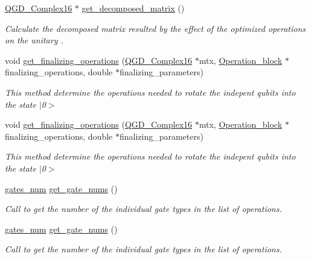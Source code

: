 \begin{DoxyCompactItemize}
\hyperlink{struct_q_g_d___complex16}{Q\+G\+D\+\_\+\+Complex16} $\ast$ \hyperlink{class_decomposition___base_ae71eaec68c77e79716cae632f97d42eb}{get\+\_\+decomposed\+\_\+matrix} ()
\begin{DoxyCompactList}\small\item\em Calculate the decomposed matrix resulted by the effect of the optimized operations on the unitary . \end{DoxyCompactList}\item 
void \hyperlink{class_decomposition___base_a9832cc5308c00b73d3e6bc331a77c7f7}{get\+\_\+finalizing\+\_\+operations} (\hyperlink{struct_q_g_d___complex16}{Q\+G\+D\+\_\+\+Complex16} $\ast$mtx, \hyperlink{class_operation__block}{Operation\+\_\+block} $\ast$finalizing\+\_\+operations, double $\ast$finalizing\+\_\+parameters)
\begin{DoxyCompactList}\small\item\em This method determine the operations needed to rotate the indepent qubits into the state $\vert$0$>$ \end{DoxyCompactList}\item 
void \hyperlink{class_decomposition___base_a9832cc5308c00b73d3e6bc331a77c7f7}{get\+\_\+finalizing\+\_\+operations} (\hyperlink{struct_q_g_d___complex16}{Q\+G\+D\+\_\+\+Complex16} $\ast$mtx, \hyperlink{class_operation__block}{Operation\+\_\+block} $\ast$finalizing\+\_\+operations, double $\ast$finalizing\+\_\+parameters)
\begin{DoxyCompactList}\small\item\em This method determine the operations needed to rotate the indepent qubits into the state $\vert$0$>$ \end{DoxyCompactList}\item 
\hyperlink{structgates__num}{gates\+\_\+num} \hyperlink{class_operation__block_ac39ab782da3e34c8ec4acf6181fbc5f7}{get\+\_\+gate\+\_\+nums} ()
\begin{DoxyCompactList}\small\item\em Call to get the number of the individual gate types in the list of operations. \end{DoxyCompactList}\item 
\hyperlink{structgates__num}{gates\+\_\+num} \hyperlink{class_operation__block_ac39ab782da3e34c8ec4acf6181fbc5f7}{get\+\_\+gate\+\_\+nums} ()
\begin{DoxyCompactList}\small\item\em Call to get the number of the individual gate types in the list of operations. \end{DoxyCompactList}\item 

\end{DoxyCompactItemize}
